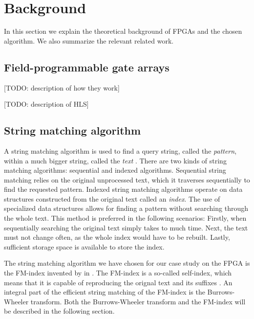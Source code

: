 \section{Background} \label{section:background}

In this section we explain the theoretical background of FPGAs and the chosen algorithm.
We also summarize the relevant related work.

\subsection{Field-programmable gate arrays}

[TODO: description of how they work]

[TODO: description of HLS]

\subsection{String matching algorithm} \label{section:background_stringmatching}

A string matching algorithm is used to find a query string, called the \textit{pattern}, within a much bigger string, called the \textit{text} \cite{makinen_compressed_2007}.
There are two kinds of string matching algorithms: sequential and indexed algorithms.
Sequential string matching relies on the original unprocessed text, which it traverses sequentially to find the requested pattern.
Indexed string matching algorithms operate on data structures constructed from the original text called an \textit{index}.
The use of specialized data structures allows for finding a pattern without searching through the whole text.
This method is preferred in the following scenarios:
Firstly, when sequentially searching the original text simply takes to much time.
Next, the text must not change often, as the whole index would have to be rebuilt.
Lastly, sufficient storage space is available to store the index.

The string matching algorithm we have chosen for our case study on the FPGA is the FM-index invented by \citeauthor{ferragina_opportunistic_2000} in \citeyear{ferragina_opportunistic_2000}\cite{ferragina_opportunistic_2000}.
The FM-index is a so-called self-index, which means that it is capable of reproducing the orignal text and its suffixes \cite{makinen_compressed_2007}.
An integral part of the efficient string matching of the FM-index is the Burrows-Wheeler transform.
Both the Burrows-Wheeler transform and the FM-index will be described in the following section.

